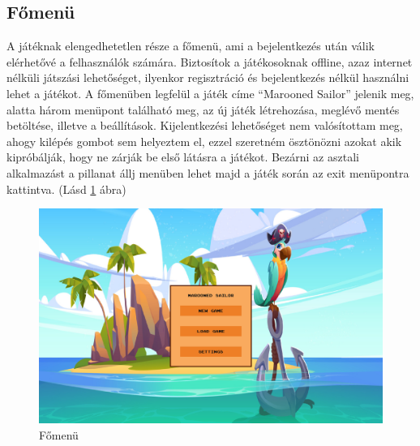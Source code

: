 \subsection{Főmenü}

\indent \indent A játéknak elengedhetetlen része a főmenü, ami a bejelentkezés után válik elérhetővé a felhasználók számára. Biztosítok a játékosoknak offline, azaz internet nélküli játszási lehetőséget, ilyenkor regisztráció és bejelentkezés nélkül használni lehet a játékot.
A főmenüben legfelül a játék címe ``Marooned Sailor'' jelenik meg, alatta három menüpont található meg, az új játék létrehozása, meglévő mentés betöltése, illetve a beállítások. Kijelentkezési lehetőséget nem valósítottam meg, ahogy kilépés gombot sem helyeztem el, ezzel szeretném ösztönözni azokat akik kipróbálják, hogy ne zárják be első látásra a játékot. Bezárni az asztali alkalmazást a pillanat állj menüben lehet majd a játék során az exit menüpontra kattintva. (Lásd \ref{fig:Főmenü} ábra) 

\begin{figure}[hbt]
    \centering
    \includegraphics[width=14.0truecm]{images/mainmenu.png}
    \caption{Főmenü}
    \label{fig:Főmenü}
\end{figure}



